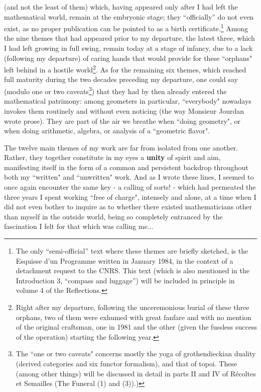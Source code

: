 (and not the least of them) which, having appeared only after I had left the mathematical world,
remain at the embryonic stage; they ``officially'' do not even exist, as no proper publication can
be pointed to as a birth certificate.\footnote{The only ``semi-official'' text where these
themes are briefly sketched, is the Esquisse d'un Programme written in January 1984, in
the context of a detachment request to the CNRS. This text (which is also mentioned in the
Introduction 3, ``compass and luggage'')
will be included in principle in volume 4 of the Reflections.} Among the nine themes that
had appeared prior to my departure, the latest three, which I had left growing in full
swing, remain today at a stage of infancy, due to a lack (following my departure) of
caring hands that would provide for these ``orphans" left behind in a hostile
world\footnote{Right after my departure, following the unceremonious burial of these three
orphans, two of them were exhumed with great fanfare and with no mention of the original
craftsman, one in 1981 and the other (given the fussless success of the operation)
starting the following year.}. As for the remaining six themes, which reached full
maturity during the two decades preceding my departure, one could say (modulo one or two
caveats\footnote{The ``one or two caveats" concerns mostly the yoga of grothendieckian
duality (derived categories and six functor formalism), and that of topoi. These (among
other things) will be discussed in detail in parts II and IV of R\'ecoltes et Semailles (The Funeral (1) and (3)).)}) 
that they had by then already entered the mathematical patrimony: among geometers in particular, ``everybody" nowadays invokes them routinely and without even noticing (the way Monsieur Jourdan wrote prose). They are part of the air we breathe when ``doing geometry", or when doing arithmetic, algebra, or analysis of a ``geometric flavor".

 The twelve main themes of my work are far from isolated from one
another. Rather, they together constitute in my eyes a \textbf{unity} of spirit and aim,
manifesting itself in the form of a common and persistent backdrop throughout both my
``written" and ``unwritten" work. And as I wrote these lines, I seemed to once again
encounter the same key - a calling of sorts! - which had permeated the three years I spent
working ``free of charge", intensely and alone, at a time when I did not even bother to inquire as to whether there existed mathematicians other than myself in the outside world, being so completely entranced by the fascination I felt for that which was calling me...

